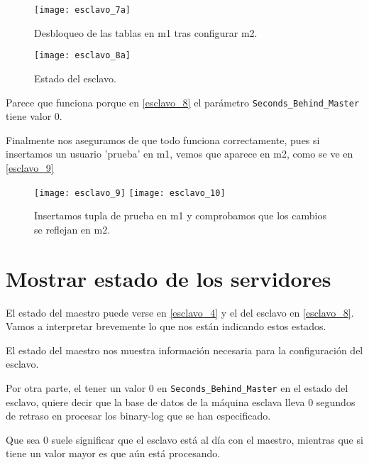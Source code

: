 \begin{figure}[h!]
\begin{center}
\caption{Desbloqueo de las tablas en m1 tras configurar m2.}
\label{esclavo_6}
\texttt{[image: esclavo\_7a]}
\end{center}
\end{figure}

\begin{figure}[h!]
\begin{center}
\caption{Estado del esclavo.}
\label{esclavo_8}
\texttt{[image: esclavo\_8a]}
\end{center}
\end{figure}

Parece que funciona porque en \eqref{esclavo_8} el parámetro \verb|Seconds_Behind_Master| tiene valor 0.

Finalmente nos aseguramos de que todo funciona correctamente, pues si insertamos un usuario 'prueba' en m1, vemos que aparece en m2, como se ve en \eqref{esclavo_9}

\begin{figure}[h!]
\begin{center}
\caption{Insertamos tupla de prueba en m1 y comprobamos que los cambios se reflejan en m2.}
\label{esclavo_9}
\texttt{[image: esclavo\_9]}
\texttt{[image: esclavo\_10]}
\end{center}
\end{figure}



\chapter{Mostrar estado de los servidores}

El estado del maestro puede verse en \eqref{esclavo_4} y el del esclavo en \eqref{esclavo_8}. Vamos a interpretar brevemente lo que nos están indicando estos estados.

El estado del maestro nos muestra información necesaria para la configuración del esclavo.

Por otra parte, el tener un valor $0$ en \verb|Seconds_Behind_Master| en el estado del esclavo, quiere decir que la base de datos de la máquina esclava lleva 0 segundos de retraso en procesar los binary-log que se han especificado.

Que sea 0 suele significar que el esclavo está al día con el maestro, mientras que si tiene un valor mayor es que aún está procesando.

